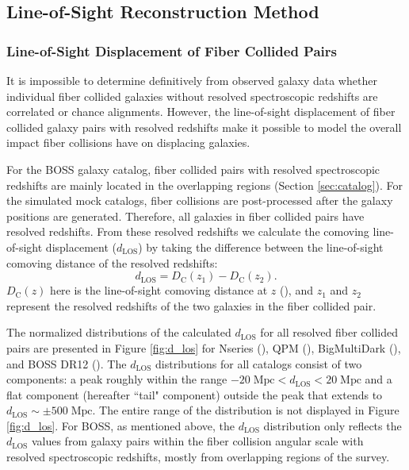 \subsection{Line-of-Sight Reconstruction Method} \label{sec:dlospeak}
\subsubsection{Line-of-Sight Displacement of Fiber Collided Pairs} \label{sec:dlos}
It is impossible to determine definitively from observed galaxy data whether 
individual fiber collided galaxies without resolved spectroscopic redshifts 
are correlated or chance alignments. However, the line-of-sight displacement of 
fiber collided galaxy pairs with resolved redshifts make it possible to model 
the overall impact fiber collisions have on displacing galaxies.

For the BOSS galaxy catalog, fiber collided pairs with resolved spectroscopic 
redshifts are mainly located in the overlapping regions (Section \ref{sec:catalog}).
For the simulated mock catalogs, fiber collisions are post-processed after 
the galaxy positions are generated. Therefore, 
all galaxies in fiber collided pairs have resolved redshifts. From these resolved 
redshifts we calculate the comoving line-of-sight displacement ($d_{\mathrm{LOS}}$) 
by taking the difference between the line-of-sight comoving distance of the 
resolved redshifts: 
\begin{equation}
d_{\mathrm{LOS}} = D_{\mathrm{C}} (z_1) - D_{\mathrm{C}} (z_2). 
\end{equation}
$D_{\mathrm{C}}(z)$ here is the line-of-sight comoving distance at $z$ 
(\citealt{Hogg:1999aa}), and $z_1$ and $z_2$ represent the resolved redshifts 
of the two galaxies in the fiber collided pair.

The normalized distributions of the calculated $d_\mathrm{LOS}$ for all
resolved fiber collided pairs are presented in Figure \ref{fig:d_los}
for Nseries (\nseriescolor), QPM (\qpmcolor), BigMultiDark (\bmdcolor), and BOSS DR12 
(\cmasscolor). The $d_{\mathrm{LOS}}$ distributions for all catalogs 
consist of two components: a peak roughly within the range $-20\;\mathrm{Mpc} 
< d_{\mathrm{LOS}} < 20\;\mathrm{Mpc}$ and a flat component (hereafter ``tail" component) 
outside the peak that extends to $d_{\mathrm{LOS}} \sim \pm 500 \;\mathrm{Mpc}$. The 
entire range of the distribution is not displayed in Figure \ref{fig:d_los}. 
For BOSS, as mentioned above, the $d_\mathrm{LOS}$ distribution only reflects the 
$d_\mathrm{LOS}$ values from galaxy pairs within the fiber collision angular scale 
with resolved spectroscopic redshifts, mostly from overlapping regions of the survey.

